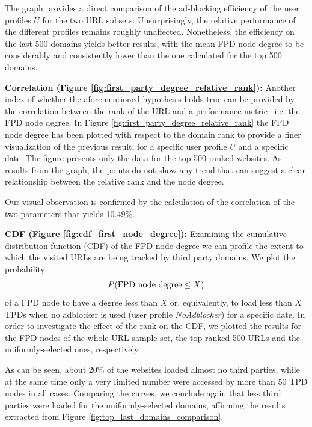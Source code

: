 \documentclass{sig-alternate}
\begin{document}
The graph provides a direct comparison of the ad-blocking efficiency of the user profiles $U$ for the two URL subsets. Unsurprisingly, the relative performance of the different profiles remains roughly unaffected. Nonetheless, the efficiency on the last 500 domains yields better results, with the mean FPD node degree to be considerably and consistently lower than the one calculated for the top 500 domains.


\textbf{Correlation (Figure \ref{fig:first_party_degree_relative_rank}):} Another index of whether the aforementioned hypothesis holds true can be provided by the correlation between the rank of the URL and a performance metric --i.e. the FPD node degree. In Figure \ref{fig:first_party_degree_relative_rank} the FPD node degree has been plotted with respect to the domain rank to provide a finer visualization of the previous result, for a specific user profile $U$ and a specific date. The figure presents only the data for the top 500-ranked websites. As results from the graph, the points do not show any trend that can suggest a clear relationship between the relative rank and the node degree.

Our visual observation is confirmed by the calculation of the correlation of the two parameters that yields 10.49\%.


\textbf{CDF (Figure \ref{fig:cdf_first_node_degree}):} Examining the cumulative distribution function (CDF) of the FPD node degree we can profile the extent to which the visited URLs are being tracked by third party domains. We plot the probability $$P(\textnormal{FPD node degree} \leq X)$$ of a FPD node to have a degree less than $X$ or, equivalently, to load less than $X$ TPDs when no adblocker is used (user profile \textit{NoAdblocker}) for a specific date. In order to investigate the effect of the rank on the CDF, we plotted the results for the FPD nodes of the whole URL sample set, the top-ranked 500 URLs and the uniformly-selected ones, respectively.

As can be seen, about 20\% of the websites loaded almost no third parties, while at the same time only a very limited number were accessed by more than 50 TPD nodes in all cases. Comparing the curves, we conclude again that less third parties were loaded for the uniformly-selected domains, affirming the results extracted from Figure \ref{fig:top_last_domains_comparison}.
\end{document}
